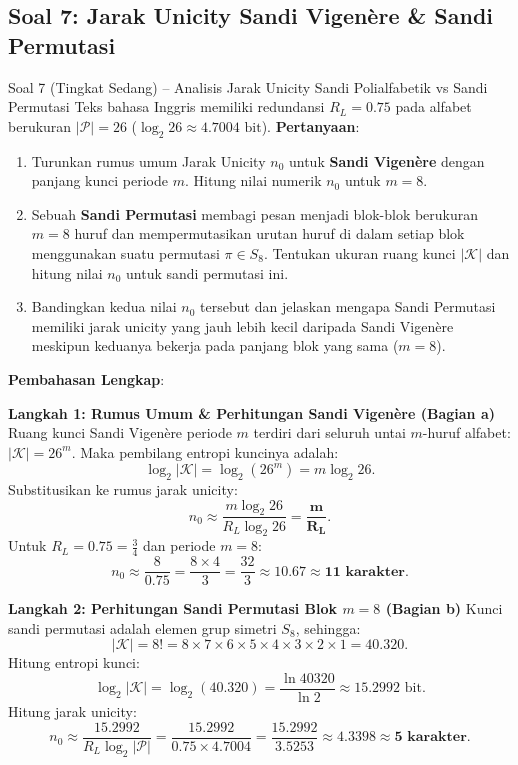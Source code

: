 \documentclass[11pt,a4paper]{article}
\begin{document}
\vspace{0.4cm}

\subsection{Soal 7: Jarak Unicity Sandi Vigenère \& Sandi Permutasi}

\begin{soalsedang}{Soal 7 (Tingkat Sedang) -- Analisis Jarak Unicity Sandi Polialfabetik vs Sandi Permutasi}
Teks bahasa Inggris memiliki redundansi $R_L = 0.75$ pada alfabet berukuran $|\mathcal{P}| = 26$ ($\log_2 26 \approx 4.7004\text{ bit}$).
\textbf{Pertanyaan}:
\begin{enumerate}[label=\alph*)]
    \item Turunkan rumus umum Jarak Unicity $n_0$ untuk \textbf{Sandi Vigen\`ere} dengan panjang kunci periode $m$. Hitung nilai numerik $n_0$ untuk $m = 8$.
    \item Sebuah \textbf{Sandi Permutasi} membagi pesan menjadi blok-blok berukuran $m = 8$ huruf dan mempermutasikan urutan huruf di dalam setiap blok menggunakan suatu permutasi $\pi \in S_8$. Tentukan ukuran ruang kunci $|\mathcal{K}|$ dan hitung nilai $n_0$ untuk sandi permutasi ini.
    \item Bandingkan kedua nilai $n_0$ tersebut dan jelaskan mengapa Sandi Permutasi memiliki jarak unicity yang jauh lebih kecil daripada Sandi Vigen\`ere meskipun keduanya bekerja pada panjang blok yang sama ($m = 8$).
\end{enumerate}
\end{soalsedang}

\noindent\textbf{Pembahasan Lengkap}:

\noindent\textbf{Langkah 1: Rumus Umum \& Perhitungan Sandi Vigenère (Bagian a)}
Ruang kunci Sandi Vigenère periode $m$ terdiri dari seluruh untai $m$-huruf alfabet: $|\mathcal{K}| = 26^m$.
Maka pembilang entropi kuncinya adalah:
\[
\log_2 |\mathcal{K}| = \log_2(26^m) = m \log_2 26.
\]
Substitusikan ke rumus jarak unicity:
\begin{equation}
n_0 \approx \frac{m \log_2 26}{R_L \log_2 26} = \mathbf{\frac{m}{R_L}}.
\end{equation}
Untuk $R_L = 0.75 = \frac{3}{4}$ dan periode $m = 8$:
\[
n_0 \approx \frac{8}{0.75} = \frac{8 \times 4}{3} = \frac{32}{3} \approx 10.67 \approx \mathbf{11\text{ karakter}}.
\]

\noindent\textbf{Langkah 2: Perhitungan Sandi Permutasi Blok $m = 8$ (Bagian b)}
Kunci sandi permutasi adalah elemen grup simetri $S_8$, sehingga:
\[
|\mathcal{K}| = 8! = 8 \times 7 \times 6 \times 5 \times 4 \times 3 \times 2 \times 1 = 40.320.
\]
Hitung entropi kunci:
\[
\log_2 |\mathcal{K}| = \log_2(40.320) = \frac{\ln 40320}{\ln 2} \approx 15.2992\text{ bit}.
\]
Hitung jarak unicity:
\[
n_0 \approx \frac{15.2992}{R_L \log_2 |\mathcal{P}|} = \frac{15.2992}{0.75 \times 4.7004} = \frac{15.2992}{3.5253} \approx 4.3398 \approx \mathbf{5\text{ karakter}}.
\]
\end{document}
